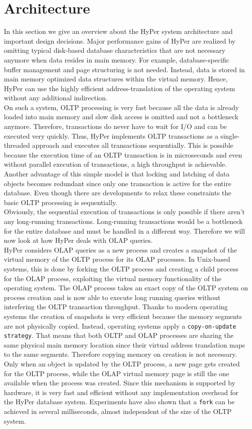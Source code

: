 \section{Architecture}
In this section we give an overview about the HyPer system architecture and important design decisions. Major performance gains of HyPer are realized by omitting typical disk-based database characteristics that are not necessary anymore when data resides in main memory. For example, database-specific buffer management and page structuring is not needed. Instead, data is stored in main memory optimized data structures within the virtual memory. Hence, HyPer can use the highly efficient address-translation of the operating system without any additional indirection.
\\
On such a system, OLTP processing is very fast because all the data is already loaded into main memory and slow disk access is omitted and not a bottleneck anymore. Therefore, transactions do never have to wait for I/O and can be executed very quickly. Thus, HyPer implements OLTP transactions as a single-threaded approach and executes all transactions sequentially. This is possible because the execution time of an OLTP transaction is in microseconds and even without parallel execution of transactions, a high throughput is achievable. Another advantage of this simple model is that locking and latching of data objects becomes redundant since only one transaction is active for the entire database. Even though there are developments to relax these constraints the basic OLTP processing is sequentially.
\\
Obviously, the sequential execution of transactions is only possible if there aren’t any long-running transactions. Long-running transactions would be a bottleneck for the entire database and must be handled in a different way. Therefore we will now look at how HyPer deals with OLAP queries.
\\
HyPer considers OLAP queries as a new process and creates a snapshot of the virtual memory of the OLTP process for its OLAP processes. In Unix-based systems, this is done by forking the OLTP process and creating a child process for the OLAP process, exploiting the virtual memory functionality of the operating system. The OLAP process takes an exact copy of the OLTP system on process creation and is now able to execute long running queries without interfering the OLTP transaction throughput. Thanks to modern operating systems the creation of snapshots is very efficient because the memory segments are not physically copied. Instead, operating systems apply a \texttt{copy-on-update strategy}. That means that both OLTP and OLAP processes are sharing the same physical main memory location since their virtual address translation maps to the same segments. Therefore copying memory on creation is not necessary. Only when an object is updated by the OLTP process, a new page gets created for the OLTP process, while the OLAP virtual memory page is still the one available when the process was created. Since this mechanism is supported by hardware, it is very fast and efficient without any implementation overhead for the HyPer database system. Experiments have also shown that a \texttt{fork} can be achieved in several milliseconds, almost independent of the size of the OLTP system.
